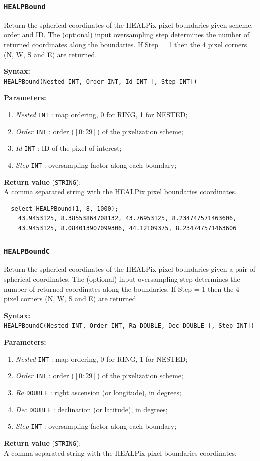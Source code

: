 \documentclass[10pt,titlepage]{article}
\newcommand{\syntax}[1]
{
  \bigskip
  \noindent
  \textbf{Syntax:} \\ 
  \indent \texttt{#1}
}
\newenvironment{parameters}
{
  \medskip
  \noindent
  \textbf{Parameters:}
  \begin{enumerate}
}
{
  \end{enumerate}
}
\newcommand{\param}[2]
{
  \item \textit{#1} \texttt{#2} 
}
\newcommand{\return}[1]
{
  \medskip
  \noindent
  \textbf{Return value} (\texttt{#1}): \\
  \indent
}
\newcommand{\example}
{
\medskip
\noindent{\textbf{Example:}}
}
\begin{document}
\subsubsection{{\tt HEALPBound}}
Return the spherical coordinates of the HEALPix pixel boundaries given scheme,
order and ID. The (optional) input oversampling step determines the
number of returned coordinates along the boundaries. If Step = 1 then the 4
pixel corners (N, W, S and E) are returned.

\syntax{HEALPBound(Nested INT, Order INT, Id INT [, Step INT])}

\begin{parameters}
  \param{Nested}{INT}: map ordering, 0 for RING, 1 for NESTED;
  \param{Order}{INT}: order ($[0:29]$) of the pixelization scheme;
  \param{Id}{INT}: ID of the pixel of interest;
  \param{Step}{INT}: oversampling factor along each boundary;
\end{parameters}

\return{STRING} A comma separated string with the HEALPix pixel boundaries
coordinates.

\example
%
\begin{verbatim}
  select HEALPBound(1, 8, 1000);
    43.9453125, 8.38553864708132, 43.76953125, 8.234747571463606,
    43.9453125, 8.084013907099306, 44.12109375, 8.234747571463606
\end{verbatim}
%
%

\subsubsection{{\tt HEALPBoundC}}
Return the spherical coordinates of the HEALPix pixel boundaries given a pair
of spherical coordinates. The (optional) input oversampling step determines the
number of returned coordinates along the boundaries. If Step = 1 then the 4
pixel corners (N, W, S and E) are returned.

\syntax{HEALPBoundC(Nested INT, Order INT, Ra DOUBLE, Dec DOUBLE [, Step INT])}

\begin{parameters}
  \param{Nested}{INT}: map ordering, 0 for RING, 1 for NESTED;
  \param{Order}{INT}: order ($[0:29]$) of the pixelization scheme;
  \param{Ra}{DOUBLE}: right ascension (or longitude), in degrees;
  \param{Dec}{DOUBLE}: declination (or latitude), in degrees;
  \param{Step}{INT}: oversampling factor along each boundary;
\end{parameters}

\return{STRING} A comma separated string with the HEALPix pixel boundaries
coordinates.
\end{document}
